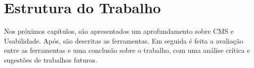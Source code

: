 \chapter{Estrutura do Trabalho}

Nos próximos capítulos, são apresentados um aprofundamento sobre CMS e Usabilidade. Após, são descritas as ferramentas. Em seguida é feita a avaliação entre as ferramentas e uma conclusão sobre o trabalho, com uma análise crítica e sugestões de trabalhos futuros.



